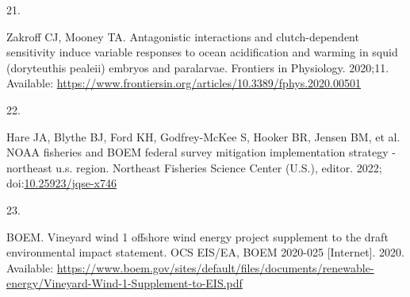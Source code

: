 \documentclass[
  10pt,
]{article}
\newlength{\cslhangindent}
\newlength{\csllabelwidth}
\newlength{\cslentryspacingunit} %
\newenvironment{CSLReferences}[2] %
 {%
  \setlength{\parindent}{0pt}
  \ifodd #1
  \let\oldpar\par
  \def\par{\hangindent=\cslhangindent\oldpar}
  \fi
  \setlength{\parskip}{#2\cslentryspacingunit}
 }%
 {}
\newcommand{\CSLLeftMargin}[1]{\parbox[t]{\csllabelwidth}{#1}}
\newcommand{\CSLRightInline}[1]{\parbox[t]{\linewidth - \csllabelwidth}{#1}\break}
\begin{document}
\begin{CSLReferences}{0}{0}
\leavevmode{}%
\CSLLeftMargin{21. }%
\CSLRightInline{Zakroff CJ, Mooney TA. Antagonistic interactions and clutch-dependent sensitivity induce variable responses to ocean acidification and warming in squid (doryteuthis pealeii) embryos and paralarvae. Frontiers in Physiology. 2020;11. Available: \url{https://www.frontiersin.org/articles/10.3389/fphys.2020.00501}}

\leavevmode{}%
\CSLLeftMargin{22. }%
\CSLRightInline{Hare JA, Blythe BJ, Ford KH, Godfrey-McKee S, Hooker BR, Jensen BM, et al. {NOAA} fisheries and {BOEM} federal survey mitigation implementation strategy - northeast u.s. region. Northeast Fisheries Science Center (U.S.), editor. 2022; doi:\href{https://doi.org/10.25923/jqse-x746}{10.25923/jqse-x746}}

\leavevmode{}%
\CSLLeftMargin{23. }%
\CSLRightInline{BOEM. Vineyard wind 1 offshore wind energy project supplement to the draft environmental impact statement. {OCS} {EIS}/{EA}, {BOEM} 2020-025 {[}Internet{]}. 2020. Available: \url{https://www.boem.gov/sites/default/files/documents/renewable-energy/Vineyard-Wind-1-Supplement-to-EIS.pdf}}

\end{CSLReferences}
\end{document}
